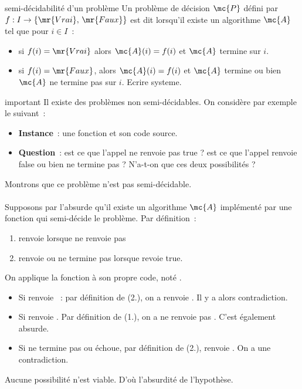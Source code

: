 \begin{definition}{}{semi-décidabilité d'un problème}
    Un problème de décision $\mc{P}$ défini par $f:I \to \{\mr{Vrai},\, \mr{Faux}\}$ est dit  lorsqu'il existe un algorithme $\mc{A}$ tel que pour $i \in I$~:
    \begin{itemize}
        \item si $f(i) = \mr{Vrai}$ alors $\mc{A}(i) = f(i)$ et $\mc{A}$ termine sur $i$.
        \item si $f(i) = \mr{Faux}$, alors $\mc{A}(i) = f(i)$ et $\mc{A}$ termine ou bien $\mc{A}$ ne termine pas sur $i$. Ecrire systeme.
    \end{itemize}
\end{definition}

\begin{exemple}{}{important}
    Il existe des problèmes non semi-décidables. On considère par exemple le suivant~:
    \begin{itemize}
        \item \textbf{Instance}~: une fonction  et  son code source.
        \item \textbf{Question}~: est ce que l'appel  ne renvoie pas true ? \ie est ce que l'appel renvoie false ou bien ne termine pas ? N'a-t-on que ces deux possibilités ?
    \end{itemize}
    Montrons que ce problème n'est pas semi-décidable.\\\\
    Supposons par l'absurde qu'il existe un algorithme $\mc{A}$ implémenté par une fonction  qui semi-décide le problème. Par définition~:
    \begin{enumerate}
        \item {} renvoie  lorsque  ne renvoie pas 
        \item {} renvoie  ou ne termine pas lorsque  revoie true.
    \end{enumerate}
    On applique la fonction  à son propre code, noté .
    \begin{itemize}
        \item Si  renvoie ~: par définition de  (2.), on a  renvoie . Il y a alors contradiction.
        \item Si  renvoie . Par définition de  (1.), on a  ne renvoie pas . C'est également absurde.
        \item Si  ne termine pas ou échoue, par définition de  (2.),  renvoie . On a une contradiction.
    \end{itemize}
    Aucune possibilité n'est viable. D'où l'absurdité de l'hypothèse.
\end{exemple}

